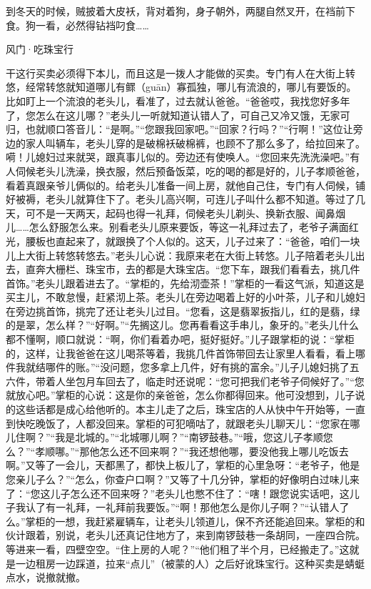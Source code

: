 \documentclass[12pt,UTF8]{ctexbook}
\begin{document}
到冬天的时候，贼披着大皮袄，背对着狗，身子朝外，两腿自然叉开，在裆前下食。狗一看，必然得钻裆叼食……





风门·吃珠宝行


干这行买卖必须得下本儿，而且这是一拨人才能做的买卖。专门有人在大街上转悠，经常转悠就知道哪儿有鳏（guān）寡孤独，哪儿有流浪的，哪儿有要饭的。比如盯上一个流浪的老头儿，看准了，过去就认爸爸。“爸爸哎，我找您好多年了，您怎么在这儿哪？”老头儿一听就知道认错人了，可自己又冷又饿，无家可归，也就顺口答音儿：“是啊。”“您跟我回家吧。”“回家？行吗？”“行啊！”这位让旁边的家人叫辆车，老头儿穿的是破棉袄破棉裤，也顾不了那么多了，给拉回来了。嗬！儿媳妇过来就哭，跟真事儿似的。旁边还有使唤人。“您回来先洗洗澡吧。”有人伺候老头儿洗澡，换衣服，然后预备饭菜，吃的喝的都是好的，儿子孝顺爸爸，看着真跟亲爷儿俩似的。给老头儿准备一间上房，就他自己住，专门有人伺候，铺好被褥，老头儿就算住下了。老头儿高兴啊，可连儿子叫什么都不知道。等过了几天，可不是一天两天，起码也得一礼拜，伺候老头儿剃头、换新衣服、闻鼻烟儿……怎么舒服怎么来。别看老头儿原来要饭，等这一礼拜过去了，老爷子满面红光，腰板也直起来了，就跟换了个人似的。这天，儿子过来了：“爸爸，咱们一块儿上大街上转悠转悠去。”老头儿心说：我原来老在大街上转悠。儿子陪着老头儿出去，直奔大栅栏、珠宝市，去的都是大珠宝店。“您下车，跟我们看看去，挑几件首饰。”老头儿跟着进去了。“掌柜的，先给沏壶茶！”掌柜的一看这气派，知道这是买主儿，不敢怠慢，赶紧沏上茶。老头儿在旁边喝着上好的小叶茶，儿子和儿媳妇在旁边挑首饰，挑完了还让老头儿过目。“您看，这是翡翠扳指儿，红的是翡，绿的是翠，怎么样？”“好啊。”“先搁这儿。您再看看这手串儿，象牙的。”老头儿什么都不懂啊，顺口就说：“啊，你们看着办吧，挺好挺好。”儿子跟掌柜的说：“掌柜的，这样，让我爸爸在这儿喝茶等着，我挑几件首饰带回去让家里人看看，看上哪件我就结哪件的账。”“没问题，您多拿上几件，好有挑的富余。”儿子儿媳妇挑了五六件，带着人坐包月车回去了，临走时还说呢：“您可把我们老爷子伺候好了。”“您就放心吧。”掌柜的心说：这是你的亲爸爸，怎么你都得回来。他可没想到，儿子说的这些话都是成心给他听的。本主儿走了之后，珠宝店的人从快中午开始等，一直到快吃晚饭了，人都没回来。掌柜的可犯嘀咕了，就跟老头儿聊天儿：“您家在哪儿住啊？”“我是北城的。”“北城哪儿啊？”“南锣鼓巷。”“哦，您这儿子孝顺您么？”“孝顺哪。”“那他怎么还不回来啊？”“我还想他哪，要没他我上哪儿吃饭去啊。”又等了一会儿，天都黑了，都快上板儿了，掌柜的心里急呀：“老爷子，他是您亲儿子么？”“怎么，你查户口啊？”又等了十几分钟，掌柜的好像明白过味儿来了：“您这儿子怎么还不回来呀？”老头儿也憋不住了：“嗐！跟您说实话吧，这儿子我认了有一礼拜，一礼拜前我要饭。”“啊！那他怎么是你儿子啊？”“认错人了么。”掌柜的一想，我赶紧雇辆车，让老头儿领道儿，保不齐还能追回来。掌柜的和伙计跟着，别说，老头儿还真记住地方了，来到南锣鼓巷一条胡同，一座四合院。等进来一看，四壁空空。“住上房的人呢？”“他们租了半个月，已经搬走了。”这就是一边租房一边踩道，拉来“点儿”（被蒙的人）之后好讹珠宝行。这种买卖是蜻蜓点水，说撤就撤。
\end{document}
